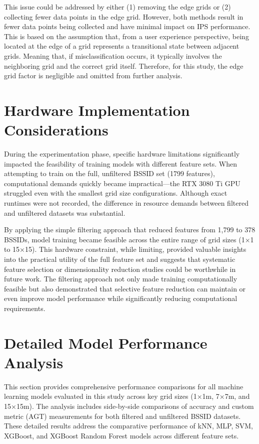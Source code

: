 \documentclass[runningheads]{llncs}
\begin{document}
This issue could be addressed by either (1) removing the edge grids or (2) collecting fewer data points in the edge grid. However, both methods result in fewer data points being collected and have minimal impact on IPS performance. This is based on the assumption that, from a user experience perspective, being located at the edge of a grid represents a transitional state between adjacent grids. Meaning that, if misclassification occurs, it typically involves the neighboring grid and the correct grid itself. Therefore, for this study, the edge grid factor is negligible and omitted from further analysis.

\section{Hardware Implementation Considerations}
During the experimentation phase, specific hardware limitations significantly impacted the feasibility of training models with different feature sets. When attempting to train on the full, unfiltered BSSID set (1799 features), computational demands quickly became impractical—the RTX 3080 Ti GPU struggled even with the smallest grid size configurations. Although exact runtimes were not recorded, the difference in resource demands between filtered and unfiltered datasets was substantial.

By applying the simple filtering approach that reduced features from 1,799 to 378 BSSIDs, model training became feasible across the entire range of grid sizes (1×1 to 15×15). This hardware constraint, while limiting, provided valuable insights into the practical utility of the full feature set and suggests that systematic feature selection or dimensionality reduction studies could be worthwhile in future work. The filtering approach not only made training computationally feasible but also demonstrated that selective feature reduction can maintain or even improve model performance while significantly reducing computational requirements.

\section{Detailed Model Performance Analysis}

This section provides comprehensive performance comparisons for all machine learning models evaluated in this study across key grid sizes (1×1m, 7×7m, and 15×15m). The analysis includes side-by-side comparisons of accuracy and custom metric (AGT) measurements for both filtered and unfiltered BSSID datasets. These detailed results address the comparative performance of kNN, MLP, SVM, XGBoost, and XGBoost Random Forest models across different feature sets.
\end{document}
